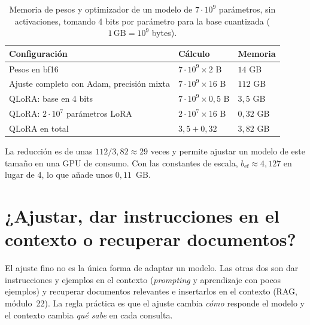 \begin{table}[h]
\centering\small
\caption{Memoria de pesos y optimizador de un modelo de $7\cdot 10^{9}$ parámetros, sin activaciones, tomando 4 bits por parámetro para la base cuantizada ($1\,\mathrm{GB}=10^{9}$ bytes).}\label{tab:memoria}
\begin{tabular}{@{}lll@{}}
\toprule
Configuración & Cálculo & Memoria \\
\midrule
Pesos en bf16 & $7\cdot 10^{9}\times 2$ B & $14$ GB \\
Ajuste completo con Adam, precisión mixta & $7\cdot 10^{9}\times 16$ B & $112$ GB \\
QLoRA: base en 4 bits & $7\cdot 10^{9}\times 0{,}5$ B & $3{,}5$ GB \\
QLoRA: $2\cdot 10^{7}$ parámetros LoRA & $2\cdot 10^{7}\times 16$ B & $0{,}32$ GB \\
QLoRA en total & $3{,}5+0{,}32$ & $3{,}82$ GB \\
\bottomrule
\end{tabular}
\end{table}

La reducción es de unas $112/3{,}82\approx 29$ veces y permite ajustar un modelo de este tamaño en una GPU de consumo. Con las constantes de escala, $b_{\mathrm{ef}}\approx 4{,}127$ en lugar de 4, lo que añade unos $0{,}11$~GB.

\section{¿Ajustar, dar instrucciones en el contexto o recuperar documentos?}

El ajuste fino no es la única forma de adaptar un modelo. Las otras dos son dar instrucciones y ejemplos en el contexto (\emph{prompting} y aprendizaje con pocos ejemplos) y recuperar documentos relevantes e insertarlos en el contexto (RAG, módulo~22). La regla práctica es que el ajuste cambia \emph{cómo} responde el modelo y el contexto cambia \emph{qué sabe} en cada consulta.

